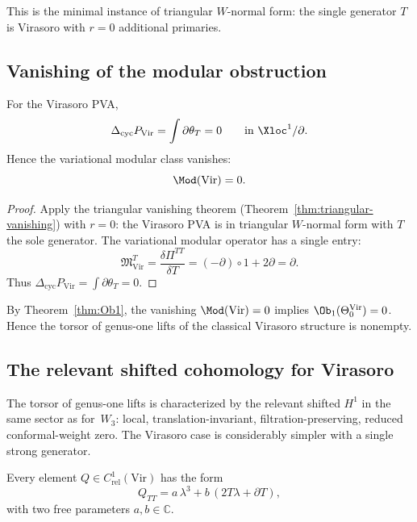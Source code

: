 This is the minimal instance of triangular $W$-normal form: the single
generator $T$ is Virasoro with $r=0$ additional primaries.

\subsection{Vanishing of the modular obstruction}
\label{subsec:virasoro-mod-vanishing}

\begin{proposition}
\label{prop:virasoro-mod-vanishing}
For the Virasoro PVA,
\[
\Delta_{\mathrm{cyc}} P_{\mathrm{Vir}} = \int \partial\theta_T = 0
\qquad\text{in }\Xloc^1/\partial.
\]
Hence the variational modular class vanishes:
\[
\Mod(\mathrm{Vir}) = 0.
\]
\end{proposition}

\begin{proof}
Apply the triangular vanishing theorem (Theorem~\ref{thm:triangular-vanishing})
with $r=0$: the Virasoro PVA is in triangular $W$-normal form with $T$ the
sole generator. The variational modular operator has a single entry:
\[
\mathfrak{M}_{\mathrm{Vir}}^T
= \frac{\delta\Pi^{TT}}{\delta T}
= (-\partial)\circ 1 + 2\partial = \partial.
\]
Thus $\Delta_{\mathrm{cyc}}P_{\mathrm{Vir}} = \int\partial\theta_T = 0$.
\end{proof}

\begin{corollary}
\label{cor:virasoro-genus1-nonempty}
By Theorem~\textup{\ref{thm:Ob1}}, the vanishing
$\Mod(\mathrm{Vir})=0$ implies
$\Ob_1(\Theta_0^{\mathrm{Vir}})=0$. Hence the torsor of genus-one lifts
of the classical Virasoro structure is nonempty.
\end{corollary}

\subsection{The relevant shifted cohomology for Virasoro}
\label{subsec:virasoro-relevant-H1}

The torsor of genus-one lifts is characterized by the relevant shifted
$H^1$ in the same sector as for~$W_3$: local, translation-invariant,
filtration-preserving, reduced conformal-weight zero. The Virasoro case is
considerably simpler with a single strong generator.

\begin{proposition}
\label{prop:virasoro-relevant-normal-form}
Every element $Q\in C^1_{\mathrm{rel}}(\mathrm{Vir})$ has the form
\[
Q_{TT} = a\,\lambda^3 + b\,(2T\lambda + \partial T),
\]
with two free parameters $a,b\in\mathbb C$.
\end{proposition}

